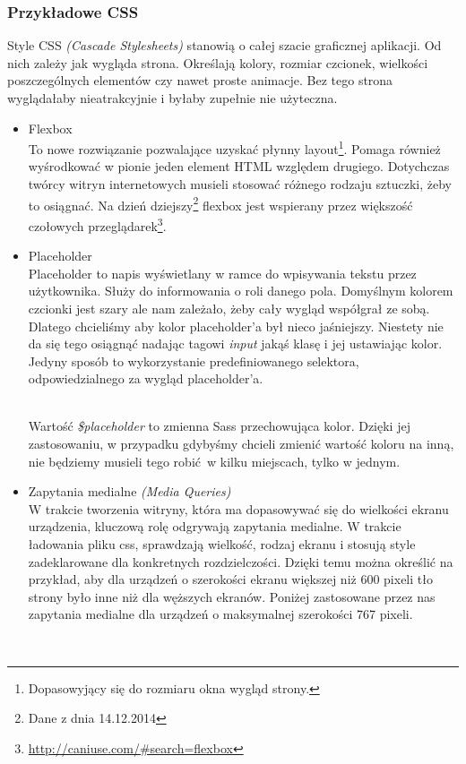     \subsubsection{Przykładowe CSS}
      Style CSS \emph{(Cascade Stylesheets)} stanowią o całej szacie graficznej aplikacji. Od nich zależy jak wygląda strona. Określają kolory, rozmiar czcionek, wielkości poszczególnych elementów czy nawet proste animacje. Bez tego strona wyglądałaby nieatrakcyjnie i byłaby zupełnie nie użyteczna.
      \begin{itemize}
        \item Flexbox\\
          To nowe rozwiązanie pozwalające uzyskać płynny layout\footnote{Dopasowyjący się do rozmiaru okna wygląd strony.}. Pomaga również wyśrodkować w pionie jeden element HTML względem drugiego. Dotychczas twórcy witryn internetowych musieli stosować różnego rodzaju sztuczki, żeby to osiągnać. Na dzień dziejszy\footnote{Dane z dnia 14.12.2014} flexbox jest wspierany przez większość czołowych przeglądarek\footnote{\url{http://caniuse.com/\#search=flexbox}}.
          
        \item Placeholder\\
          Placeholder to napis wyświetlany w ramce do wpisywania tekstu przez użytkownika. Służy do informowania o roli danego pola. Domyślnym kolorem czcionki jest szary ale nam zależało, żeby cały wygląd współgrał ze sobą. Dlatego chcieliśmy aby kolor placeholder'a był nieco jaśniejszy. Niestety nie da się tego osiągnąć nadając tagowi \emph{input} jakąś klasę i jej ustawiając kolor. Jedyny sposób to wykorzystanie predefiniowanego selektora, odpowiedzialnego za wygląd placeholder'a.

          \begin{code}
            
          \end{code}\\

          Wartość \emph{\$placeholder} to zmienna Sass przechowująca kolor. Dzięki jej zastosowaniu, w przypadku gdybyśmy chcieli zmienić wartość koloru na inną, nie będziemy musieli tego robić w kilku miejscach, tylko w jednym.

        \item Zapytania medialne \emph{(Media Queries)}\\
          W trakcie tworzenia witryny, która ma dopasowywać się do wielkości ekranu urządzenia, kluczową rolę odgrywają zapytania medialne. W trakcie ładowania pliku css, sprawdzają wielkość, rodzaj ekranu i stosują style zadeklarowane dla konkretnych rozdzielczości. Dzięki temu można określić na przykład, aby dla urządzeń o szerokości ekranu większej niż 600 pixeli tło strony było inne niż dla węższych ekranów.
          Poniżej zastosowane przez nas zapytania medialne dla urządzeń o maksymalnej szerokości 767 pixeli.
          \begin{code}
            
          \end{code}\\


\end{itemize}
